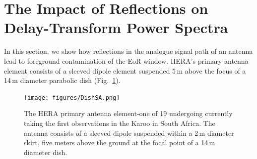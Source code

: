 \documentclass[twocolumn]{emulateapj}
\begin{document}
\section{The Impact of Reflections on Delay-Transform Power Spectra}\label{sec:Formalism}
In this section, we show how reflections in the analogue signal path of an antenna lead to foreground contamination of the EoR window. HERA's primary antenna element consists of a sleeved dipole element suspended 5\,m above the focus of a 14\,m diameter parabolic dish (Fig.~\ref{fig:Dish}).

\begin{figure}
\texttt{[image: figures/DishSA.png]}
\caption{The HERA primary antenna element-one of 19 undergoing currently taking the first observations in the Karoo in South Africa. The antenna consists of a sleeved dipole suspended within a 2\,m diameter skirt, five meters above the ground at the focal point of a 14\,m diameter dish.}\label{fig:Dish}
\end{figure}
\end{document}
